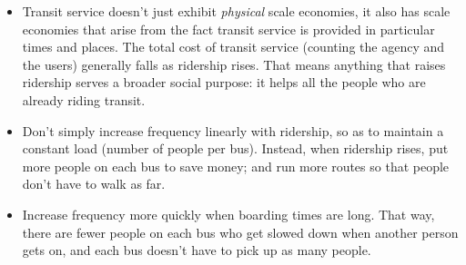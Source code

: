 \documentclass[11pt]{article}
\providecommand{\tightlist}{%
      \setlength{\itemsep}{0pt}\setlength{\parskip}{0pt}}
\begin{document}
\begin{itemize}
\tightlist
\item
  Transit service doesn't just exhibit \emph{physical} scale economies,
  it also has scale economies that arise from the fact transit service
  is provided in particular times and places. The total cost of transit
  service (counting the agency and the users) generally falls as
  ridership rises. That means anything that raises ridership serves a
  broader social purpose: it helps all the people who are already riding
  transit.
\item
  Don't simply increase frequency linearly with ridership, so as to
  maintain a constant load (number of people per bus). Instead, when
  ridership rises, put more people on each bus to save money; and run
  more routes so that people don't have to walk as far.
\item
  Increase frequency more quickly when boarding times are long. That
  way, there are fewer people on each bus who get slowed down when
  another person gets on, and each bus doesn't have to pick up as many
  people.
\end{itemize}


    
    
    
    
\end{document}
